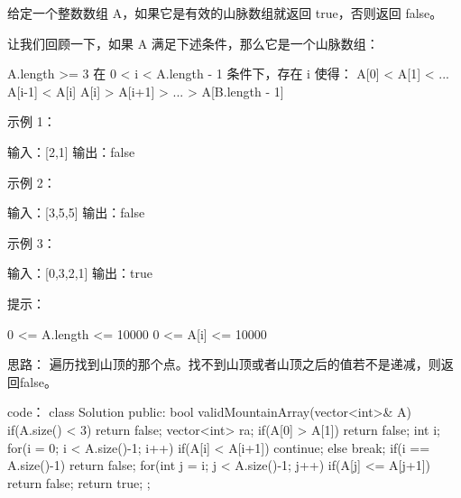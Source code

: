 给定一个整数数组 A，如果它是有效的山脉数组就返回 true，否则返回 false。

让我们回顾一下，如果 A 满足下述条件，那么它是一个山脉数组：

    A.length >= 3
    在 0 < i < A.length - 1 条件下，存在 i 使得：
        A[0] < A[1] < ... A[i-1] < A[i]
        A[i] > A[i+1] > ... > A[B.length - 1]

 

示例 1：

输入：[2,1]
输出：false

示例 2：

输入：[3,5,5]
输出：false

示例 3：

输入：[0,3,2,1]
输出：true

 

提示：

    0 <= A.length <= 10000
    0 <= A[i] <= 10000 





























思路：
遍历找到山顶的那个点。找不到山顶或者山顶之后的值若不是递减，则返回false。






























code：
class Solution {
public:
    bool validMountainArray(vector<int>& A) {
        if(A.size() < 3) return false;
        vector<int> ra;
        if(A[0] > A[1]) return false;
        int i;
        for(i = 0; i < A.size()-1; i++)
        {
            if(A[i] < A[i+1]) continue;
            else break;
        }
        if(i == A.size()-1) return false;
        for(int j = i; j < A.size()-1; j++)
        {
            if(A[j] <= A[j+1]) return false;
        }
        return true;
    }
};